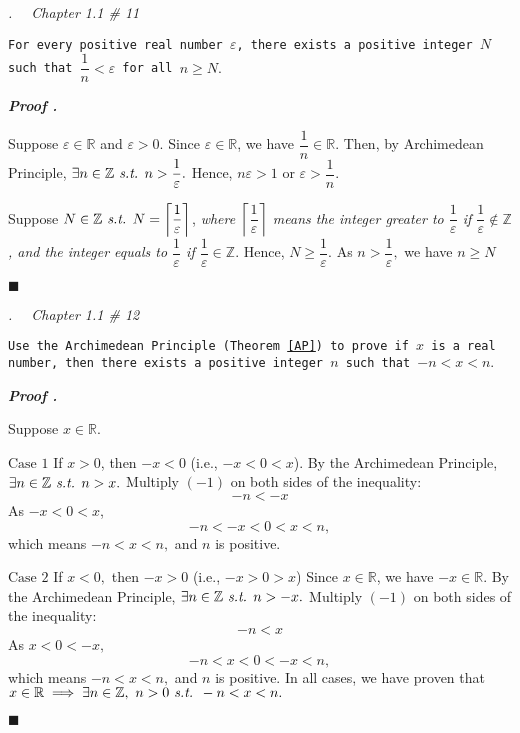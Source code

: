 \documentclass[11pt,letter]{article}
\newcounter{nq}[section]
\newcounter{np}[section]
\newenvironment*{p}{\par\noindent\textbf{\textit{Proof \stepcounter{np}\thenp. }}\par}{\par\hfill $\blacksquare$\par}
\newenvironment*{q}[1]{\noindent\emph{\thesection.\stepcounter{nq}\thenq$\quad $ #1}\par\noindent\texttt}{}
\def\Z{{\mathbb{Z}}}
\def\R{{\mathbb{R}}}
\def\st{\emph{ s.t. }}
\begin{document}
\begin{framed}\begin{q}
	{Chapter 1.1 \# 11}
	{For every positive real number $\varepsilon$, there exists a positive integer $N$ such that $\dfrac{1}{n}<\varepsilon$ for all $n\geq N.$}
\end{q}\end{framed}
\begin{p}
	Suppose $\varepsilon\in\R$ and $\varepsilon>0.$ Since $\varepsilon\in\R$, we have $\dfrac{1}{n}\in\R.$ Then, by Archimedean Principle, $\exists n\in\Z\st n>\dfrac{1}{\varepsilon}.$ Hence, $n\varepsilon>1$ or $\varepsilon>\dfrac{1}{n}.$\par 
	Suppose $N\in\Z\st N=\left\lceil\dfrac{1}{\varepsilon}\right\rceil$, \textit{where $\left\lceil\dfrac{1}{\varepsilon}\right\rceil$ means the integer greater to $\dfrac{1}{\varepsilon}$ if $\dfrac{1}{\varepsilon}\notin\Z$, and the integer equals to $\dfrac{1}{\varepsilon}$ if $\dfrac{1}{\varepsilon}\in\Z.$} Hence, $N\geq\dfrac{1}{\varepsilon}.$ As $n>\dfrac{1}{\varepsilon},$ we have $n\geq N$
\end{p}

\begin{framed}\begin{q}
	{Chapter 1.1 \# 12}
	{Use the Archimedean Principle (Theorem \ref{AP}) to prove if $x$ is a real number, then there exists a positive integer $n$ such that $-n<x<n.$}
\end{q}\end{framed}
\begin{p}
	Suppose $x\in\R.$\par 
	$\boxed{\text{Case }1}$ If $x>0$, then $-x<0$ (i.e., $-x<0<x$). By the Archimedean Principle, $\exists n\in\Z\st n>x.$ Multiply $(-1)$ on both sides of the inequality: \[-n<-x\] As $-x<0<x$, \[-n<-x<0<x<n,\] which means $-n<x<n,$ and $n$ is positive.\par 
	$\boxed{\text{Case }2}$ If $x<0,$ then $-x>0$ (i.e., $-x>0>x$) Since $x\in\R$, we have $-x\in\R$. By the Archimedean Principle, $\exists n\in\Z\st n>-x.$ Multiply $(-1)$ on both sides of the inequality: \[-n<x\] As $x<0<-x,$ \[-n<x<0<-x<n,\] which means $-n<x<n,$ and $n$ is positive. In all cases, we have proven that $x\in\R\implies\exists n\in\Z,\ n>0\st-n<x<n.$
\end{p}
\end{document}
